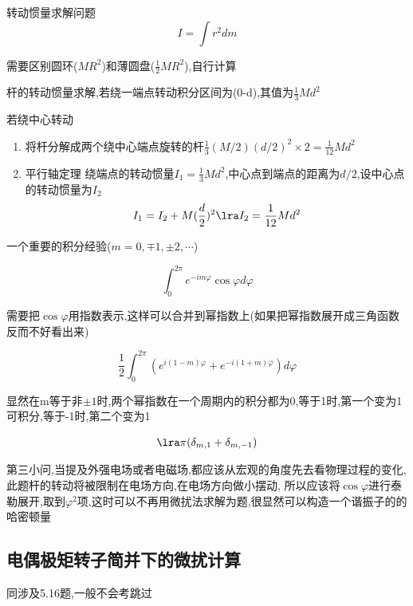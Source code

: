             \begin{formal}
                转动惯量求解问题
                $$ I = \int r^{2} dm $$

                需要区别圆环($MR^{2}$)和薄圆盘($\frac{1}{2}MR^{2}$),自行计算

                杆的转动惯量求解,若绕一端点转动积分区间为(0-d),其值为$ \frac{1}{3}Md^{2} $

                若绕中心转动
                \begin{enumerate}
                    \item 将杆分解成两个绕中心端点旋转的杆$ \frac{1}{3}(M/2)(d/2)^{2} \times 2 = \frac{1}{12} Md^{2} $
                    \item 平行轴定理
                          绕端点的转动惯量$I_{1} = \frac{1}{3} M d^{2}$,中心点到端点的距离为$d/2$,设中心点的转动惯量为$I_{2}$
                          $$ I_{1} = I_{2} + M(\frac{d}{2})^{2} \lra I_{2} = \frac{1}{12} M d^{2}$$
                \end{enumerate}
            \end{formal}

            \begin{formal}
                一个重要的积分经验($m = 0, \mp 1, \pm 2, \cdots $)

                $$ \int_{0}^{2\pi} e^{- i m \varphi} \cos{\varphi} d\varphi $$

                需要把$\cos{\varphi}$用指数表示,这样可以合并到幂指数上(如果把幂指数展开成三角函数反而不好看出来)
                
                $$ \dfrac{1}{2} \int_{0}^{2\pi} (e^{i(1-m)\varphi} + e^{-i(1+m)\varphi})  d\varphi$$

                显然在m等于非$\pm 1$时,两个幂指数在一个周期内的积分都为0,等于1时,第一个变为1可积分,等于-1时,第二个变为1

                $$ \lra \pi (\delta_{m,1}+\delta_{m,-1}) $$
            \end{formal}

            第三小问,当提及外强电场或者电磁场,都应该从宏观的角度先去看物理过程的变化,此题杆的转动将被限制在电场方向,在电场方向做小摆动,
            所以应该将$\cos{\varphi}$进行泰勒展开,取到$\varphi^{2}$项,这时可以不再用微扰法求解为题,很显然可以构造一个谐振子的的哈密顿量
        
        \subsection{电偶极矩转子简并下的微扰计算}
            同涉及5.16题,一般不会考跳过
        
